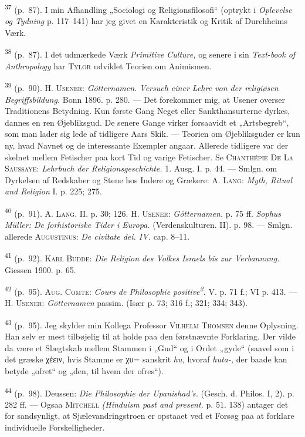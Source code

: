 \documentclass[12pt,a4paper,openany]{book}
\begin{document}
\begin{small}
\textsuperscript{37} (p.~87). I min Afhandling „Sociologi og
Religionsfilosofi“ (optrykt i
\textit{Oplevelse og Tydning} p. 117--141) har jeg givet en
Karakteristik og Kritik af Durchheims Værk.

\textsuperscript{38} (p.~87). I det udmærkede Værk \textit{Primitive
Culture,} og senere i sin
\textit{Text-book of Anthropology} har \textsc{Tylor} udviklet Teorien
om Animismen.

\textsuperscript{39} (p.~90). H. \textsc{Usener}: \textit{Götternamen.
Versuch einer Lehre von der
religiøsen Begriffsbildung.} Bonn 1896. p. 280. --- Det forekommer mig,
at Usener overser Traditionens Betydning. Kun første Gang Neget eller
Sankthansurterne dyrkes, dannes en ren Øjebliksgud. De senere Gange
virker forsaavidt et „Artsbegreb“, som man lader sig lede af tidligere
Aars Skik. --- Teorien om Øjebliksguder er kun ny, hvad Navnet og de
interessante Exempler angaar. Allerede tidligere var der skelnet mellem
Fetischer paa kort Tid og varige Fetischer. Se \textsc{Chanthépie De La
Saussaye}: \textit{Lehrbuch der Religionsgeschichte.} 1. Ausg. I. p. 44.
--- Smlgn. om Dyrkelsen af Redskaber og Stene hos Indere og Grækere: A.
\textsc{Lang}: \textit{Myth, Ritual and Religion} I. p. 225; 275.

\textsuperscript{40} (p.~91). A. \textsc{Lang}. II. p. 30; 126. H.
\textsc{Usener}:
\textit{Götternamen.} p. 75 ff. \textit{Sophus Müller: De forhistoriske
Tider i Europa.} (Verdenskulturen. II). p. 98. --- Smlgn. allerede
\textsc{Augustinus}: \textit{De civitate dei. IV.} cap. 8--11.

\textsuperscript{41} (p.~92). \textsc{Karl Budde}: \textit{Die Religion
des Volkes Israels bis zur
Verbannung.} Giessen 1900. p. 65.

\textsuperscript{42} (p.~95). \textsc{Aug. Comte}: \textit{Cours de
Philosophie
positive\textsuperscript{2}.} V. p. 71 f.; VI p. 413. --- H.
\textsc{Usener}: \textit{Götternamen} passim. (Især p. 73; 316 f.; 321;
334; 343).

\textsuperscript{43} (p.~95). Jeg skylder min Kollega Professor
\textsc{Vilhelm Thomsen} denne
Oplysning. Han selv er mest tilbøjelig til at holde paa den førstnævnte
Forklaring. Der vilde da være et Slægtskab mellem Stammen i „Gud“ og i
Ordet „gyde“ (saavel som i det græske χέειν, hvis Stamme er χυ= sanskrit
\textit{hu,} hvoraf \textit{huta-,} der baade kan betyde „ofret“ og
„den, til hvem der ofres“).

\textsuperscript{44} (p.~98). Deussen: \textit{Die Philosophie der
Upanishad’s.} (Gesch. d. Philos. I,
2). p. 282 ff. --- Ogsaa \textsc{Mitchell} \textit{(Hinduism past and
present.} p. 51. 138) antager det for sandsynligt, at
Sjælevandringstroen er opstaaet ved et Forsøg paa at forklare
individuelle Forskelligheder.


\end{small}
\end{document}
